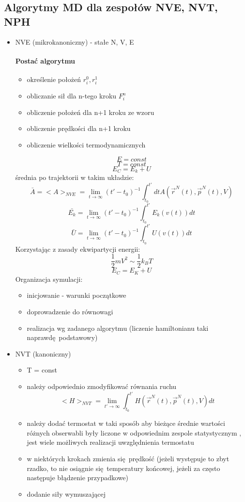 \documentclass{article}
\begin{document}
		\subsection{Algorytmy MD dla zespołów NVE, NVT, NPH}
		\begin{itemize}
			\item NVE (mikrokanoniczny)	- stałe N, V, E
				\paragraph{Postać algorytmu}
				\begin{itemize}
					\item określenie położeń $r_i^0, r_i^1$
					\item obliczanie sił dla n-tego kroku $F_i^n$
					\item obliczenie położeń dla n+1 kroku ze wzoru
					\item obliczenie prędkości dla n+1 kroku 
					\item obliczenie wielkości termodynamicznych
				\end{itemize}
				$$E = const$$
				$$T = const$$
				$$E_C = E_k + U$$
				średnia po trajektorii w takim układzie:
				$$\bar{A} = <A>_{NVE} = \lim\limits_{t \rightarrow \infty} 
				(t' - t_0)^{-1} \int_{t_0}^{t'}dtA(\vec{r}^N(t),\vec{p}^N(t),V)$$
				$$\bar{E_k} = \lim\limits_{t \rightarrow \infty}(t' - t_0)^{-1}
				\int_{t_0}^{t'}E_k(v(t))dt$$
				$$\bar{U} = \lim\limits_{t \rightarrow \infty}(t' - t_0)^{-1}
				\int_{t_0}^{t'}U(v(t))dt$$
				Korzystając z zasady ekwipartycji energii:
				$$\frac{1}{2}mV^2 \sim \frac{1}{2} k_BT$$
				$$E_C = E_K + U$$
				Organizacja symulacji: 
				\begin{itemize}
					\item inicjowanie - warunki początkowe
					\item doprowadzenie do równowagi
					\item realizacja wg zadanego algorytmu (liczenie hamiltonianu taki naprawdę podstawowy)
				\end{itemize}
			\item NVT (kanoniczny)
					\begin{itemize}
						\item T = const
						\item należy odpowiednio zmodyfikować równania ruchu
						$$<H>_{NVT} = \lim\limits_{t' \rightarrow \infty } 
						\int_{t_0}^{t'}H(\vec{r}^N(t), \vec{p}^N(t), V)dt$$
						\item należy dodać termostat w taki sposób aby bieżące średnie wartości różnych obserwabli były liczone w odpowiednim zespole statystycznym , jest wiele możliwych realizacji uwzględnienia termostatu
						\item w niektórych krokach zmienia się prędkość (jeżeli występuje to zbyt rzadko, to nie osiągnie się temperatury końcowej, jeżeli za często następuje błądzenie przypadkowe)
						\item dodanie siły wymuszającej
					\end{itemize}

\end{itemize}
\end{document}
